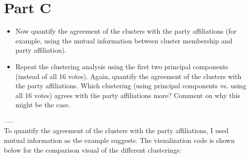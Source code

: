  \section{Part C}
 \begin{itemize}
 \item
Now quantify the agreement of the clusters with the party affiliations (for example, using the mutual information between cluster membership and party affiliation). 
\item
Repeat the clustering analysis using the first two principal components (instead of all 16 votes). Again, quantify the agreement of the clusters with the party affiliations. Which clustering (using principal components vs. using all 16 votes) agrees with the party affiliations more? Comment on why this might be the case. 
\end{itemize}

-----\\

To quantify the agreement of the clusters with the party affiliations, I used mutual information as the example suggests. The visualization code is shown below for the comparison visual of the different clusterings:

